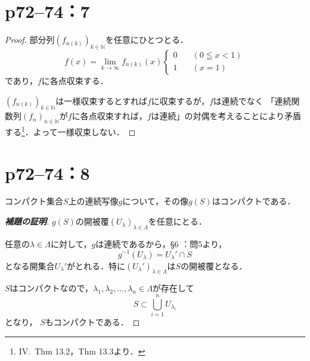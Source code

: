 \section*{p72--74：7}

\begin{tleftbar}
    \begin{proof}
        部分列$(f_{n(k)})_{k \in \mathbb{N}}$を任意にひとつとる．
        \[
            f(x)= \lim_{k \to \infty} f_{n(k)}(x)
            \begin{cases}
                0 \quad  & ( 0 \leqq x < 1) \\
                1  \quad & ( x=1)
            \end{cases}
        \]
        であり，$f$に各点収束する．

        $(f_{n(k)})_{k \in \mathbb{N}}$は一様収束するとすれば$f$に収束するが，$f$は連続でなく
        「連続関数列$(f_n)_{n \in \mathbb{N}}$が$f$に各点収束すれば，$f$は連続」の対偶を考えることにより矛盾する\footnote{IV.~Thm 13.2，Thm 13.3より．}．よって一様収束しない．
    \end{proof}
\end{tleftbar}

\newpage


\section*{p72--74：8}



コンパクト集合$S$上の連続写像$g$について，その像$g(S)$はコンパクトである．

\begin{proof}[\textup{\textbf{補題の証明}}]
    $g(S)$の開被覆$(U_{\lambda})_{\lambda \in \Lambda}$を任意にとる．

    任意の$\lambda \in \Lambda$に対して，$g$は連続であるから，\S 6 ：問5より，
    \[
        g^{-1}(U_{\lambda}) =  U_{\lambda}'  \cap S
    \]
    となる開集合$U_{\lambda}'$がとれる．特に$(U_{\lambda}')_{\lambda \in \Lambda}$は$S$の開被覆となる．

    $S$はコンパクトなので，$\lambda_1, \lambda_2, \ldots , \lambda_n \in \Lambda$が存在して
    \[
        S \subset \bigcup_{i=1}^{n} U_{\lambda_i}
    \]
    となり， $S$もコンパクトである．
\end{proof}

